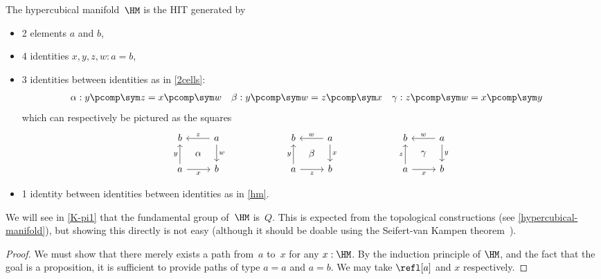 \documentclass[a4paper]{article}
\begin{document}
\begin{definition}
  The hypercubical manifold~$\HM$ is the HIT generated by
  \begin{itemize}
  \item 2 elements $a$ and $b$,
  \item 4 identities $x,y,z,w:a=b$,
  \item 3 identities between identities as in \cref{2cells}:
    \begin{align*}
      \alpha:y\pcomp\sym z&=x\pcomp\sym w
      &
      \beta:y\pcomp\sym w&=z\pcomp\sym x
      &
      \gamma:z\pcomp\sym w&=x\pcomp\sym y
    \end{align*}
    which can respectively be pictured as the squares
    \[
      \begin{tikzcd}
        b\ar[dr,phantom,"\alpha"]&\ar[l,"z"']\ar[d,"w"]a\\
        a\ar[u,"y"]\ar[r,"x"']&b
      \end{tikzcd}
      \qquad\qquad\qquad
      \begin{tikzcd}
        b\ar[dr,phantom,"\beta"]&\ar[l,"w"']\ar[d,"x"]a\\
        a\ar[u,"y"]\ar[r,"z"']&b
      \end{tikzcd}
      \qquad\qquad\qquad
      \begin{tikzcd}
        b\ar[dr,phantom,"\gamma"]&\ar[l,"w"']\ar[d,"y"]a\\
        a\ar[u,"z"]\ar[r,"x"']&b
      \end{tikzcd}
    \]
  \item 1 identity between identities between identities as in \cref{hm}.
  \end{itemize}
\end{definition}

We will see in \cref{K-pi1} that the fundamental group of~$\HM$ is~$Q$. This is expected from the topological constructions (see \cref{hypercubical-manifold}), but showing this directly is not easy (although it should be doable using the Seifert-van Kampen theorem~\cite[Section 8.7]{hottbook}).

\begin{proof}
  We must show that there merely exists a path from~$a$ to~$x$ for any $x : \HM$. By the induction principle of $\HM$, and the fact that the goal is a proposition, it is sufficient to provide paths of type $a = a$ and $a = b$. We may take $\refl[a]$ and $x$ respectively.
\end{proof}
\end{document}
